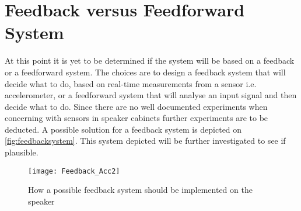 \section{Feedback versus Feedforward System} \label{sec:feedback}

At this point it is yet to be determined if the system will be based on a feedback or a feedforward system. The choices are to design a feedback system that will decide what to do, based on real-time measurements from a sensor i.e. accelerometer, or a feedforward system that will analyse an input signal and then decide what to do. Since there are no well documented experiments when concerning with sensors in speaker cabinets further experiments are to be deducted. A possible solution for a feedback system is depicted on \autoref{fig:feedbacksystem}. This system depicted will be further investigated to see if plausible.

\begin{figure}[H]
\centering
\texttt{[image: Feedback\_Acc2]}
\caption{How a possible feedback system should be implemented on the speaker}
\label{fig:feedbacksystem}
\end{figure}


